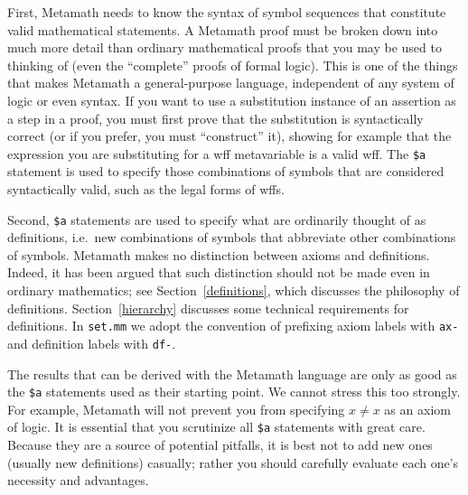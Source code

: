 First, Metamath needs to know the syntax of symbol
sequences that constitute valid mathematical statements.  A Metamath
proof must be broken down into much more detail than ordinary
mathematical proofs that you may be used to thinking of (even the
``complete'' proofs of formal logic).  This is one
of the things that makes Metamath a general-purpose language,
independent of any system of logic or even syntax.  If you want to use a
substitution instance of an assertion as a step in a proof, you must
first prove that the substitution is syntactically correct (or if you
prefer, you must ``construct'' it), showing for example that the
expression you are substituting for a wff metavariable is a valid wff.
The \texttt{\$a} statement is used to
specify those combinations of symbols that are considered syntactically
valid, such as the legal forms of wffs.

Second, \texttt{\$a} statements are used to specify what are ordinarily thought of
as definitions, i.e.\ new combinations of symbols that abbreviate other
combinations of symbols.  Metamath makes no distinction between axioms and definitions.
Indeed, it has been argued that such distinction should not be made even in
ordinary mathematics; see Section~\ref{definitions}, which discusses the
philosophy of definitions.  Section~\ref{hierarchy} discusses some
technical requirements for definitions.  In \texttt{set.mm} we adopt the
convention of prefixing axiom labels with \texttt{ax-} and definition labels with
\texttt{df-}\index{label}.

The results that can be derived with the Metamath language are only as good as
the \texttt{\$a}\index{\texttt{\$a} statement} statements used as their starting
point.  We cannot stress this too strongly.  For example, Metamath will
not prevent you from specifying $x\neq x$ as an axiom of logic.  It is
essential that you scrutinize all \texttt{\$a} statements with great care.
Because they are a source of potential pitfalls, it is best not to add new
ones (usually new definitions) casually; rather you should carefully evaluate
each one's necessity and advantages.

